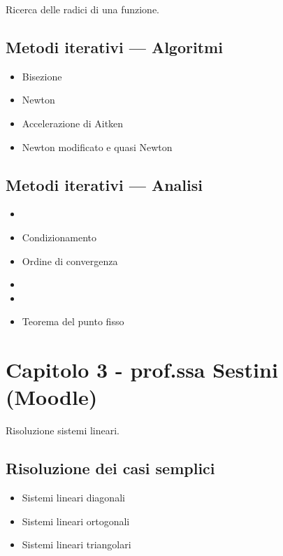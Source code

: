 \documentclass[a4paper, 12pt]{article}
\begin{document}
Ricerca delle radici di una funzione.

\subsection{Metodi iterativi --- Algoritmi}
	\begin{itemize}
		\item Bisezione
		\item Newton
		\item Accelerazione di Aitken
		\item Newton modificato e quasi Newton
	\end{itemize}

\subsection{Metodi iterativi --- Analisi}
	\begin{itemize}
		\item \color{blue}{Criteri di arresto} \color{black}
		\item Condizionamento
		\item Ordine di convergenza
		\item \color{blue}{Convergenza locale} \color{black}
		\item \color{blue}{Comportamento in caso di radici multiple} \color{black}
		\item Teorema del punto fisso
	\end{itemize}

\vspace{0.5cm}

\section{Capitolo 3 - prof.ssa Sestini (Moodle)}

Risoluzione sistemi lineari.

\subsection{Risoluzione dei casi semplici}
	\begin{itemize}
		\item Sistemi lineari diagonali
		\item Sistemi lineari ortogonali
		\item Sistemi lineari triangolari
	\end{itemize}
\end{document}
